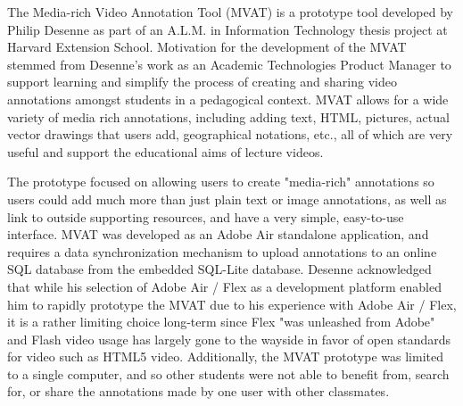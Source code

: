 The Media-rich Video Annotation Tool (MVAT) is a prototype tool developed by Philip Desenne as part of an A.L.M. in Information Technology thesis project at Harvard Extension School.  Motivation for the development of the MVAT stemmed from Desenne's work as an Academic Technologies Product Manager to support learning and simplify the process of creating and sharing video annotations amongst students in a pedagogical context.  MVAT allows for a wide variety of media rich annotations, including adding text, HTML, pictures, actual vector drawings that users add, geographical notations, etc., all of which are very useful and support the educational aims of lecture videos.

The prototype focused on allowing users to create "media-rich" annotations so users could add much more than just plain text or image annotations, as well as link to outside supporting resources, and have a very simple, easy-to-use interface.  MVAT was developed as an Adobe Air standalone application, and requires a data synchronization mechanism to upload annotations to an online SQL database from the embedded SQL-Lite database.  Desenne acknowledged that while his selection of Adobe Air / Flex as a development platform enabled him to rapidly prototype the MVAT due to his experience with Adobe Air / Flex, it is a rather limiting choice long-term since Flex "was unleashed from Adobe" and Flash video usage has largely gone to the wayside in favor of open standards for video such as HTML5 video.  Additionally, the MVAT prototype was limited to a single computer, and so other students were not able to benefit from, search for, or share the annotations made by one user with other classmates.





